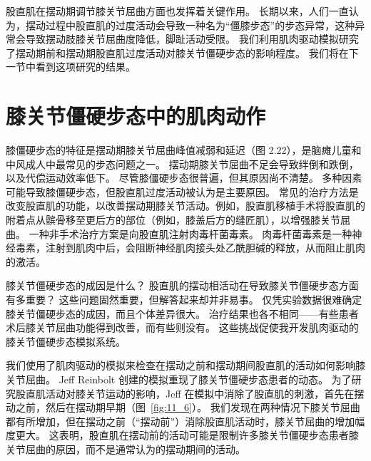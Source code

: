 股直肌在摆动期调节膝关节屈曲方面也发挥着关键作用。
长期以来，人们一直认为，摆动过程中股直肌的过度活动会导致一种名为“僵膝步态”的步态异常，这种异常会导致摆动肢膝关节屈曲度降低，脚趾活动受限。
我们利用肌肉驱动模拟研究了摆动期前和摆动期股直肌过度活动对膝关节僵硬步态的影响程度。
我们将在下一节中看到这项研究的结果。


\section{膝关节僵硬步态中的肌肉动作}

膝僵硬步态的特征是摆动期膝关节屈曲峰值减弱和延迟（图 2.22），是脑瘫儿童和中风成人中最常见的步态问题之一。
摆动期膝关节屈曲不足会导致绊倒和跌倒，以及代偿运动效率低下。
尽管膝僵硬步态很普遍，但其原因尚不清楚。
多种因素可能导致膝僵硬步态，但股直肌过度活动被认为是主要原因。
常见的治疗方法是改变股直肌的功能，以改善摆动期膝关节活动。例如，股直肌移植手术将股直肌的附着点从髌骨移至更后方的部位（例如，膝盖后方的缝匠肌），以增强膝关节屈曲。
一种非手术治疗方案是向股直肌注射肉毒杆菌毒素。
肉毒杆菌毒素是一种神经毒素，注射到肌肉中后，会阻断神经肌肉接头处乙酰胆碱的释放，从而阻止肌肉的激活。


膝关节僵硬步态的成因是什么？
股直肌的摆动相活动在导致膝关节僵硬步态方面有多重要？
这些问题固然重要，但解答起来却并非易事。
仅凭实验数据很难确定膝关节僵硬步态的成因，而且个体差异很大。
治疗结果也各不相同——有些患者术后膝关节屈曲功能得到改善，而有些则没有。
这些挑战促使我开发肌肉驱动的膝关节僵硬步态模拟系统。


我们使用了肌肉驱动的模拟来检查在摆动之前和摆动期间股直肌的活动如何影响膝关节屈曲。
Jeff Reinbolt 创建的模拟重现了膝关节僵硬步态患者的动态。
为了研究股直肌活动对膝关节运动的影响，Jeff 在模拟中消除了股直肌的刺激，首先在摆动之前，然后在摆动期早期（图~\ref{fig:11_6}）。
我们发现在两种情况下膝关节屈曲都有所增加，但在摆动之前（“摆动前”）消除股直肌活动时，膝关节屈曲的增加幅度更大。
这表明，股直肌在摆动前的活动可能是限制许多膝关节僵硬步态患者膝关节屈曲的原因，而不是通常认为的摆动期间的活动。


